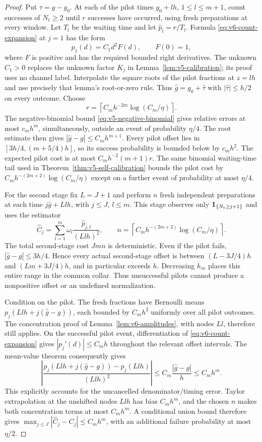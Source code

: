 \begin{proof}
Put $\tau=g-g_0$. At each of the pilot times $g_0+lh$,
$1\le l\le m+1$, count successes of $N_t\ge2$ until $r$ successes
have occurred, using fresh preparations at every window. Let $T_l$
be the waiting time and let $\widehat p_l=r/T_l$. Formula
\eqref{eq:v6-count-expansion} at $j=1$ has the form
\[
 p_1(d)=C_1d^2F(d),\qquad F(0)=1,
\]
where $F$ is positive and has the required bounded right derivatives.
The unknown $C_1>0$ replaces the unknown factor $K_j$ in
Lemma~\ref{lem:v5-calibration}; its proof uses no channel label.
Interpolate the square roots of the pilot fractions at $z=lh$ and
use precisely that lemma's root-or-zero rule. Thus
$\widehat g=g_0+\widehat\tau$ with
$|\widehat\tau|\le h/2$ on every outcome.
Choose
\[
 r=\left\lceil C_mh^{-2m}\log(C_m/\eta)\right\rceil.
\]
The negative-binomial bound \eqref{eq:v5-negative-binomial} gives
relative errors at most $c_mh^m$, simultaneously, outside an event of
probability $\eta/4$. The root estimate then gives
$|\widehat g-g|\le C_mh^{m+1}$.
Every pilot offset lies in $[3h/4,(m+5/4)h]$, so its success
probability is bounded below by $c_mh^2$. The expected pilot cost is
at most $C_mh^{-2}(m+1)r$. The same binomial waiting-time tail used
in Theorem~\ref{thm:v5-self-calibration} bounds the pilot cost by
$C_mh^{-(2m+2)}\log(C_m/\eta)$ except on a further event of probability
at most $\eta/4$.

For the second stage fix $L=J+1$ and perform $n$ fresh independent
preparations at each time $j\widehat g+Llh$, with $j\le J$, $l\le m$.
This stage observes only $\mathbf1_{\{N_t\ge j+1\}}$ and uses the estimator
\[
 \widehat C_j=\sum_{l=1}^m\omega_l
                   \frac{\widehat p_{j,l}}{(Llh)^2},\qquad
 n=\left\lceil C_mh^{-(2m+2)}\log(C_m/\eta)\right\rceil.
\]
The total second-stage cost $Jmn$ is deterministic. Even if the pilot
fails, $|\widehat g-g|\le3h/4$. Hence every actual second-stage offset
is between $(L-3J/4)h$ and $(Lm+3J/4)h$, and in particular exceeds
$h$. Decreasing $h_m$ places this entire range in the common collar.
Thus unsuccessful pilots cannot produce a nonpositive offset or an
undefined normalization.

Condition on the pilot. The fresh fractions have Bernoulli means
$p_j(Llh+j(\widehat g-g))$, each bounded by $C_mh^2$ uniformly over
all pilot outcomes. The concentration proof of
Lemma~\ref{lem:v6-amplitudes}, with nodes $Ll$, therefore still applies.
On the successful pilot event, differentiation of
\eqref{eq:v6-count-expansion} gives $|p_j'(d)|\le C_mh$ throughout the
relevant offset intervals. The mean-value theorem consequently gives
\[
 \left|\frac{p_j(Llh+j(\widehat g-g))-p_j(Llh)}{(Llh)^2}\right|
                 \le C_m\frac{|\widehat g-g|}{h}\le C_mh^m.
\]
This explicitly accounts for the uncancelled denominator/timing error.
Taylor extrapolation at the unshifted nodes $Llh$ has bias $C_mh^m$,
and the chosen $n$ makes both concentration terms at most $C_mh^m$.
A conditional union bound therefore gives
$\max_{j\le J}|\widehat C_j-C_j|\le C_mh^m$, with an additional
failure probability at most $\eta/2$.


\end{proof}
